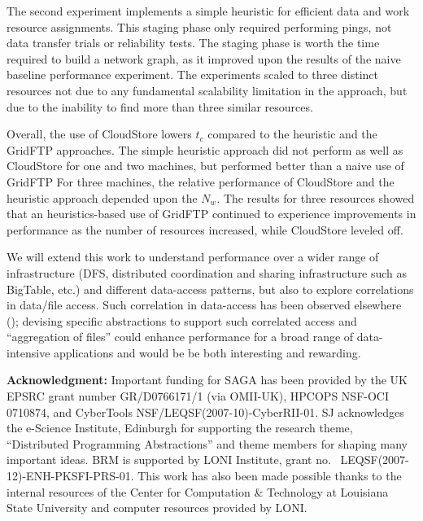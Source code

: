 \documentclass{rspublic}
\begin{document}
The second experiment implements a simple heuristic for efficient data
and work resource assignments. This staging phase only required
performing pings, not data transfer trials or reliability tests. The
staging phase is worth the time required to build a network graph, as
it improved upon the results of the naive baseline performance
experiment. The experiments scaled to three distinct resources not due
to any fundamental scalability limitation in the approach, but due to
the inability to find more than three similar resources.
 
Overall, the use of CloudStore lowers $t_c$ compared to the
heuristic and the GridFTP approaches. The simple heuristic 
approach did not perform as well as CloudStore for one and two
machines, but performed better than a naive use of GridFTP For three
machines, the relative performance of CloudStore and the heuristic
approach depended upon the $N_w$. The results for three resources
showed that an heuristics-based use of GridFTP continued to experience
improvements in performance as the number of resources increased, while
CloudStore leveled off. 

We will extend this work to understand performance over a wider range
of infrastructure (DFS, distributed coordination and sharing
infrastructure such as BigTable, etc.) and different data-access
patterns, but also to explore correlations in data/file access. Such
correlation in data-access has been observed elsewhere
(\cite{filecule}); devising specific abstractions to support such
correlated access and ``aggregation of files'' could enhance
performance for a broad range of data-intensive applications and would
be be both interesting and rewarding.

{\bf Acknowledgment:} Important funding for SAGA has been provided by
the UK EPSRC grant number GR/D0766171/1 (via OMII-UK), HPCOPS
NSF-OCI 0710874, and CyberTools NSF/LEQSF(2007-10)-CyberRII-01.
 SJ acknowledges the e-Science Institute, Edinburgh
for supporting the research theme, ``Distributed Programming
Abstractions'' and theme members for shaping many important ideas. BRM
is supported by LONI Institute, grant no. \
LEQSF(2007-12)-ENH-PKSFI-PRS-01. This work has also been made possible
thanks to the internal resources of the Center for Computation \&
Technology at Louisiana State University and computer resources
provided by LONI.

\vspace{-0.4cm}


%
 

\end{document}
